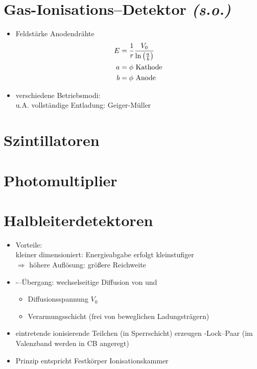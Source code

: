 \documentclass[BCOR=5mm,DIV=calc,listof=totoc,headings=big]{scrartcl}
\begin{document}
\section{Gas-Ionisations--Detektor \emph{(s.o.)}}
\label{sec:gas-ionis-detekt}
\begin{itemize}
\item Feldstärke Anodendrähte
  \begin{align*}
    E&=\frac{1}{r} \frac{V_{0}}{\ln\del{\frac{a}{b}}}\\
    a&=\phi \text{ Kathode}\\
    b&=\phi \text{ Anode}
  \end{align*}
\item verschiedene Betriebsmodi:\\
  u.A. vollständige Entladung: Geiger-Müller
\end{itemize}

\section{Szintillatoren}
\label{sec:szintillatoren}

\section{Photomultiplier}
\label{sec:photomultiplier}

\section{Halbleiterdetektoren}
\label{sec:halbleiterdetektoren}
\begin{itemize}
\item Vorteile:\\
  kleiner dimensioniert: Energieabgabe erfolgt kleinstufiger\\
  $\Rightarrow$ höhere Auflösung: größere Reichweite
\item \Pproton-\Pneutron--Übergang: wechselseitige Diffusion von
  \Pelectron und \Pproton
  \begin{itemize}
  \item Diffusionsspannung $V_{0}$
  \item Verarmungsschicht (frei von beweglichen Ladungsträgern)
  \end{itemize}
\item eintretende ionisierende Teilchen (in Sperrschicht) erzeugen
  \Pelectron-Lock--Paar (\Pelectron im Valenzband werden in CB angeregt)
\item Prinzip entspricht Festkörper Ionisationskammer
\end{itemize}
\end{document}
